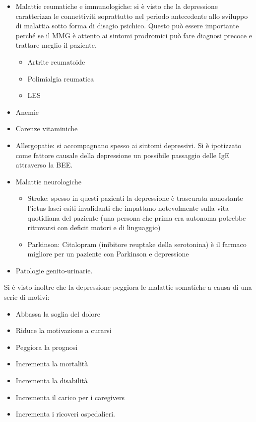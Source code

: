\begin{itemize}
\item
  Malattie reumatiche e immunologiche: si è visto che la depressione
  caratterizza le connettiviti soprattutto nel periodo antecedente allo
  sviluppo di malattia sotto forma di disagio psichico. Questo può
  essere importante perché se il MMG è attento ai sintomi prodromici può
  fare diagnosi precoce e trattare meglio il paziente.

\begin{itemize}
\item
  Artrite reumatoide
\item
  Polimialgia reumatica
\item
  LES
\end{itemize}

\item
  Anemie
\item
  Carenze vitaminiche
\item
  Allergopatie: si accompagnano spesso ai sintomi depressivi. Si è
  ipotizzato come fattore causale della depressione un possibile
  passaggio delle IgE attraverso la BEE.
\item
  Malattie neurologiche

\begin{itemize}
\item
  Stroke: spesso in questi pazienti la depressione è trascurata
  nonostante l'ictus lasci esiti invalidanti che impattano notevolmente
  sulla vita quotidiana del paziente (una persona che prima era autonoma
  potrebbe ritrovarsi con deficit motori e di linguaggio)
\item
  Parkinson: Citalopram (inibitore reuptake della serotonina) è il
  farmaco migliore per un paziente con Parkinson e depressione
\end{itemize}

\item
  Patologie genito-urinarie.
\end{itemize}

Si è visto inoltre che la depressione peggiora le malattie somatiche a
causa di una serie di motivi:

\begin{itemize}
\item
  Abbassa la soglia del dolore
\item
  Riduce la motivazione a curarsi
\item
  Peggiora la prognosi
\item
  Incrementa la mortalità
\item
  Incrementa la disabilità
\item
  Incrementa il carico per i caregivers
\item
  Incrementa i ricoveri ospedalieri.
\end{itemize}

